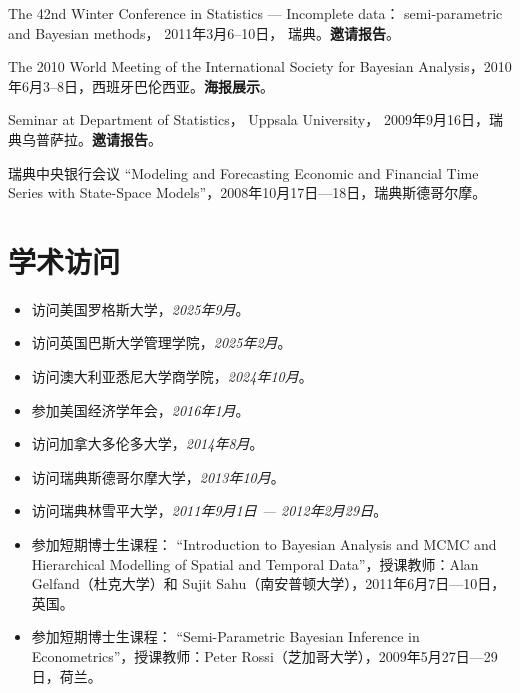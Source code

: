 \documentclass[twoside,a4paper,11pt]{article}
\begin{document}
\begin{etaremune}[itemsep=0ex,parsep=0pt]
\item The 42nd Winter Conference in Statistics --- Incomplete data：
  semi-parametric and Bayesian methods， 2011年3月6--10日，
  瑞典。\textbf{邀请报告}。

\item The 2010 World Meeting of the International Society for Bayesian
  Analysis，2010年6月3--8日，西班牙巴伦西亚。\textbf{海报展示}。

\item Seminar at Department of Statistics， Uppsala University， 2009年9月16日，瑞典乌普萨拉。\textbf{邀请报告}。

\item 瑞典中央银行会议 ``Modeling and Forecasting Economic and
  Financial Time Series with State-Space Models''，2008年10月17日---18日，瑞典斯德哥尔摩。

\end{etaremune}


\section{学术访问}

\begin{itemize}
\item 访问美国罗格斯大学，\emph{2025年9月}。
\item 访问英国巴斯大学管理学院，\emph{2025年2月}。
\item 访问澳大利亚悉尼大学商学院，\emph{2024年10月}。
\item 参加美国经济学年会，\emph{2016年1月}。
\item 访问加拿大多伦多大学，\emph{2014年8月}。
\item 访问瑞典斯德哥尔摩大学，\emph{2013年10月}。

\item 访问瑞典林雪平大学，\emph{2011年9月1日 --- 2012年2月29日}。

\item 参加短期博士生课程： ``Introduction to Bayesian Analysis and
  MCMC and Hierarchical Modelling of Spatial and Temporal Data''，授课教师：Alan Gelfand（杜克大学）和 Sujit Sahu（南安普顿大学），2011年6月7日---10日，英国。

\item 参加短期博士生课程： ``Semi-Parametric Bayesian Inference in
  Econometrics''，授课教师：Peter Rossi（芝加哥大学），2009年5月27日---29日，荷兰。

\end{itemize}
\end{document}
